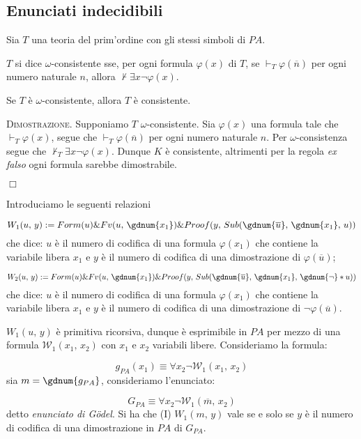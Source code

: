 \subsection{Enunciati indecidibili}
	
	Sia $T$ una teoria del prim'ordine con gli stessi simboli di $PA$.
	
	\begin{defi}
	$T$ si dice $\omega$-consistente sse, per ogni formula $\varphi(x)$ di $T$,
	se $\vdash_T\varphi(\overline{n})$ per ogni numero naturale $n$, allora
	$\not\vdash\exists x\neg\varphi(x)$.
	\end{defi}
	
	\begin{thm}
	Se $T$ \`e $\omega$-consistente, allora $T$ \`e consistente.
	\end{thm}
	\textsc{Dimostrazione.} Supponiamo $T$ $\omega$-consistente.
	Sia $\varphi(x)$ una formula tale che $\vdash_T
	\varphi(x)$, segue che $\vdash_T\varphi(\overline{n})$ per ogni
	numero naturale $n$. Per $\omega$-consistenza segue che
	$\not\vdash_T\exists x\neg\varphi(x)$. Dunque $K$
	\`e consistente, altrimenti per la regola \textit{ex falso} ogni formula
	sarebbe dimostrabile.\begin{flushright}$\Box$\end{flushright}
	
	Introduciamo le seguenti relazioni
	
	$$
	W_1(u,\,y):=Form(u)\& Fv(u,\,\gdnum{x_1})\& Proof(y,\,Sub(
	\gdnum{\overline{u}},\,\gdnum{x_1},\,u))
	$$
	che dice: $u$ \`e il numero di codifica di una formula $\varphi(x_1)$
	che contiene la variabile libera $x_1$
	e $y$ \`e il numero di codifica di una dimostrazione di $\varphi(\overline{u})$;
	
	$$
	W_2(u,\,y):=Form(u)\& Fv(u,\,\gdnum{x_1})\& Proof(y,\,Sub(
	\gdnum{\overline{u}},\,\gdnum{x_1},\,\gdnum{\neg}\ast u))
	$$
	che dice: $u$ \`e il numero di codifica di una formula $\varphi(x_1)$
	che contiene la variabile libera $x_1$
	e $y$ \`e il numero di codifica di una dimostrazione di
	$\neg\varphi(\overline{u})$.
	
	$W_1(u,\,y)$ \`e primitiva ricorsiva, dunque \`e esprimibile in $PA$ per mezzo
	di una formula $\mathcal{W}_1(x_1,\,x_2)$ con $x_1$ e $x_2$ variabili libere.
	Consideriamo la formula:
	
	$$
	g_{PA}(x_1)\equiv\forall x_2\neg\mathcal{W}_1(x_1,\,x_2)
	$$
	sia $m=\gdnum{g_{PA}}$, consideriamo l'enunciato:
	
	$$
	G_{PA}\equiv\forall x_2\neg\mathcal{W}_1(\overline{m},\,x_2)
	$$
	detto \emph{enunciato di G\"odel}. Si ha che
	(I) $W_1(m,\,y)$ vale se e solo se $y$ \`e il numero di codifica
	di una dimostrazione in $PA$ di $G_{PA}$.
	
